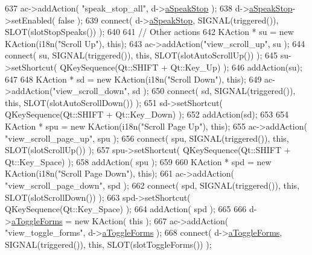 \begin{DoxyCode}
637     ac->addAction( \textcolor{stringliteral}{"speak\_stop\_all"}, d->\hyperlink{classPageViewPrivate_ac0ad1db7d08f13202e952d1b0743a377}{aSpeakStop} );
638     d->\hyperlink{classPageViewPrivate_ac0ad1db7d08f13202e952d1b0743a377}{aSpeakStop}->setEnabled( \textcolor{keyword}{false} );
639     connect( d->\hyperlink{classPageViewPrivate_ac0ad1db7d08f13202e952d1b0743a377}{aSpeakStop}, SIGNAL(triggered()), SLOT(slotStopSpeaks()) );
640 
641     \textcolor{comment}{// Other actions}
642     KAction * su  = \textcolor{keyword}{new} KAction(i18n(\textcolor{stringliteral}{"Scroll Up"}), \textcolor{keyword}{this});
643     ac->addAction(\textcolor{stringliteral}{"view\_scroll\_up"}, su );
644     connect( su, SIGNAL(triggered()), \textcolor{keyword}{this}, SLOT(slotAutoScrollUp()) );
645     su->setShortcut( QKeySequence(Qt::SHIFT + Qt::Key\_Up) );
646     addAction(su);
647 
648     KAction * sd  = \textcolor{keyword}{new} KAction(i18n(\textcolor{stringliteral}{"Scroll Down"}), \textcolor{keyword}{this});
649     ac->addAction(\textcolor{stringliteral}{"view\_scroll\_down"}, sd );
650     connect( sd, SIGNAL(triggered()), \textcolor{keyword}{this}, SLOT(slotAutoScrollDown()) );
651     sd->setShortcut( QKeySequence(Qt::SHIFT + Qt::Key\_Down) );
652     addAction(sd);
653 
654     KAction * spu = \textcolor{keyword}{new} KAction(i18n(\textcolor{stringliteral}{"Scroll Page Up"}), \textcolor{keyword}{this});
655     ac->addAction( \textcolor{stringliteral}{"view\_scroll\_page\_up"}, spu );
656     connect( spu, SIGNAL(triggered()), \textcolor{keyword}{this}, SLOT(slotScrollUp()) );
657     spu->setShortcut( QKeySequence(Qt::SHIFT + Qt::Key\_Space) );
658     addAction( spu );
659 
660     KAction * spd = \textcolor{keyword}{new} KAction(i18n(\textcolor{stringliteral}{"Scroll Page Down"}), \textcolor{keyword}{this});
661     ac->addAction( \textcolor{stringliteral}{"view\_scroll\_page\_down"}, spd );
662     connect( spd, SIGNAL(triggered()), \textcolor{keyword}{this}, SLOT(slotScrollDown()) );
663     spd->setShortcut( QKeySequence(Qt::Key\_Space) );
664     addAction( spd );
665 
666     d->\hyperlink{classPageViewPrivate_af0990514eb2a448c1400a4cecc0ca6bb}{aToggleForms} = \textcolor{keyword}{new} KAction( \textcolor{keyword}{this} );
667     ac->addAction( \textcolor{stringliteral}{"view\_toggle\_forms"}, d->\hyperlink{classPageViewPrivate_af0990514eb2a448c1400a4cecc0ca6bb}{aToggleForms} );
668     connect( d->\hyperlink{classPageViewPrivate_af0990514eb2a448c1400a4cecc0ca6bb}{aToggleForms}, SIGNAL(triggered()), \textcolor{keyword}{this}, SLOT(slotToggleForms()) );

\end{DoxyCode}
